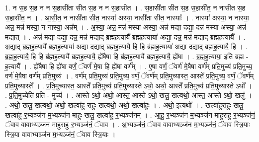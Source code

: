 \documentclass[17pt]{extarticle}
\begin{document}
1. न स॒ह स॒ह न न स॒हासी॑ता सीत स॒ह न न स॒हासी॑त । . स॒हासी॑ता सीत स॒ह स॒हासी॑त॒ न नासी॑त स॒ह स॒हासी॑त॒ न । . आ॒सी॒त॒ न नासी॑ता सीत॒ नास्या॑ अस्या॒ नासी॑ता सीत॒ नास्याः᳚ । . नास्या॑ अस्या॒ न नास्या॒ अन्न॒ मन्न॑ मस्या॒ न नास्या॒ अन्न᳚म् । . अ॒स्या॒ अन्न॒ मन्न॑ मस्या अस्या॒ अन्न॑ मद्या दद्या॒ दन्न॑ मस्या अस्या॒ अन्न॑ मद्यात् । . अन्न॑ मद्या दद्या॒ दन्न॒ मन्न॑ मद्याद् ब्रह्मह॒त्यायै᳚ ब्रह्मह॒त्याया॑ अद्या॒ दन्न॒ मन्न॑ मद्याद् ब्रह्मह॒त्यायै᳚ । . अ॒द्या॒द् ब्र॒ह्म॒ह॒त्यायै᳚ ब्रह्मह॒त्याया॑ अद्या दद्याद् ब्रह्मह॒त्यायै॒ हि हि ब्र॑ह्मह॒त्याया॑ अद्या दद्याद् ब्रह्मह॒त्यायै॒ हि । . ब्र॒ह्म॒ह॒त्यायै॒ हि हि ब्र॑ह्मह॒त्यायै᳚ ब्रह्मह॒त्यायै॒ ह्ये॑षैषा हि ब्र॑ह्मह॒त्यायै᳚ ब्रह्मह॒त्यायै॒ ह्ये॑षा । . ब्र॒ह्म॒ह॒त्याया॒ इति॑ ब्रह्म - ह॒त्यायै᳚ । . ह्ये॑षैषा हि ह्ये॑षा वर्णं॒ ॅवर्ण॑ मे॒षा हि ह्ये॑षा वर्ण᳚म् । . ए॒षा वर्णं॒ ॅवर्ण॑ मे॒षैषा वर्ण॑म् प्रति॒मुच्य॑ प्रति॒मुच्य॒ वर्ण॑ मे॒षैषा वर्ण॑म् प्रति॒मुच्य॑ । . वर्ण॑म् प्रति॒मुच्य॑ प्रति॒मुच्य॒ वर्णं॒ ॅवर्ण॑म् प्रति॒मुच्यास्त॒ आस्ते᳚ प्रति॒मुच्य॒ वर्णं॒ ॅवर्ण॑म् प्रति॒मुच्यास्ते᳚ । . प्र॒ति॒मुच्यास्त॒ आस्ते᳚ प्रति॒मुच्य॑ प्रति॒मुच्यास्ते ऽथो॒ अथो॒ आस्ते᳚ प्रति॒मुच्य॑ प्रति॒मुच्यास्ते ऽथो᳚ । . प्र॒ति॒मुच्येति॑ प्रति - मुच्य॑ । . आस्ते ऽथो॒ अथो॒ आस्त॒ आस्ते ऽथो॒ खलु॒ खल्वथो॒ आस्त॒ आस्ते ऽथो॒ खलु॑ । . अथो॒ खलु॒ खल्वथो॒ अथो॒ खल्वा॑हु राहुः॒ खल्वथो॒ अथो॒ खल्वा॑हुः । . अथो॒ इत्यथो᳚ । . खल्वा॑हुराहुः॒ खलु॒ खल्वा॑हु र॒भ्यञ्ज॑न म॒भ्यञ्ज॑न माहुः॒ खलु॒ खल्वा॑हु र॒भ्यञ्ज॑नम् । . आ॒हु॒ र॒भ्यञ्ज॑न म॒भ्यञ्ज॑न माहुराहु र॒भ्यञ्ज॑नं॒ ॅवाव वावाभ्यञ्ज॑न माहुराहु र॒भ्यञ्ज॑नं॒ ॅवाव । . अ॒भ्यञ्ज॑नं॒ ॅवाव वावाभ्यञ्ज॑न म॒भ्यञ्ज॑नं॒ ॅवाव स्त्रि॒याः स्त्रि॒या वावाभ्यञ्ज॑न म॒भ्यञ्ज॑नं॒ ॅवाव स्त्रि॒याः । \newline
\end{document}
